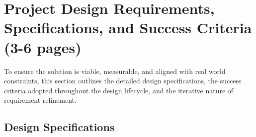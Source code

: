 \documentclass[12pt]{article}
\begin{document}
\section{Project Design Requirements, Specifications, and Success Criteria (3-6 pages)}


\par To ensure the solution is viable, measurable, and aligned with real world constraints, this section outlines the detailed design specifications, the success criteria adopted throughout the design lifecycle, and the iterative nature of requirement refinement.

\subsection{Design Specifications}
\end{document}
